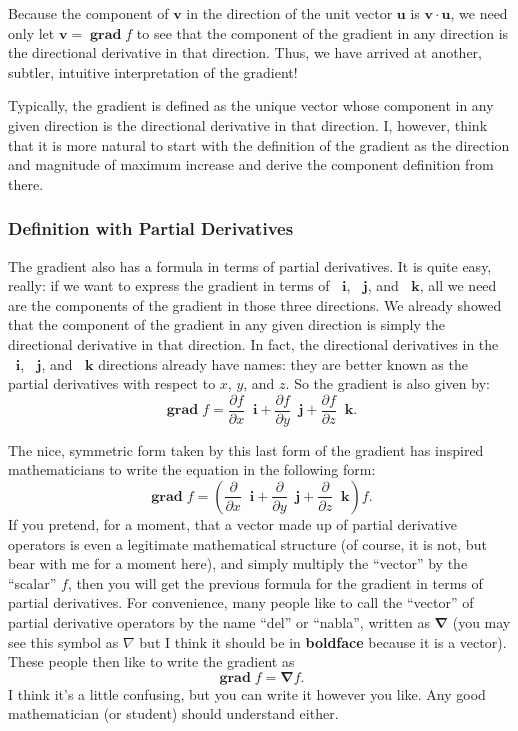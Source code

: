 \documentclass{myarticle}
\DeclareMathOperator{\grad}{\mathbf{grad}}
\renewcommand{\vec}[1]{\mathbf{#1}}
\newcommand{\unitvector}[1]{
  \mathop{}\!\vec{#1}
}
\newcommand{\ih}{\unitvector{i}}
\newcommand{\jh}{\unitvector{j}}
\newcommand{\kh}{\unitvector{k}}
\newcommand{\del}{\boldsymbol{\nabla}}
\theoremstyle{nospace}
\newtheorem{old series theorem}{Theorem}
\newenvironment{series theorem}
{\begin{mdframed}\begin{old series theorem}}
    {\end{old series theorem}\end{mdframed}}
\begin{document}
Because the component of $\vec{v}$ in the direction of the unit vector
$\vec{u}$ is $\vec{v} \cdot \vec{u}$, we need only let
$\vec{v} = \grad f$ to see that the component of the gradient in any
direction is the directional derivative in that direction. Thus, we
have arrived at another, subtler, intuitive interpretation of the
gradient!

Typically, the gradient is defined as the unique vector whose
component in any given direction is the directional derivative in that
direction. I, however, think that it is more natural to start with the
definition of the gradient as the direction and magnitude of maximum
increase and derive the component definition from there.

\subsubsection{Definition with Partial Derivatives}
\label{sec:gradient definition with partial derivatives}

The gradient also has a formula in terms of partial derivatives. It is
quite easy, really: if we want to express the gradient in terms of
$\ih$, $\jh$, and $\kh$, all we need are the components of the
gradient in those three directions. We already showed that the
component of the gradient in any given direction is simply the
directional derivative in that direction. In fact, the directional
derivatives in the $\ih$, $\jh$, and $\kh$ directions already have
names: they are better known as the partial derivatives with respect
to $x$, $y$, and $z$. So the gradient is also given by:
\[
  \grad f =
  \frac{\partial f}{\partial x} \ih +
  \frac{\partial f}{\partial y} \jh +
  \frac{\partial f}{\partial z} \kh.
\]

The nice, symmetric form taken by this last form of the gradient has
inspired mathematicians to write the equation in the following form:
\[
  \grad f = \left(
    \frac{\partial}{\partial x} \ih +
    \frac{\partial}{\partial y} \jh +
    \frac{\partial}{\partial z} \kh
  \right)f.
\]
If you pretend, for a moment, that a vector made up of partial
derivative operators is even a legitimate mathematical structure (of
course, it is not, but bear with me for a moment here), and simply
multiply the ``vector'' by the ``scalar'' $f$, then you will get the
previous formula for the gradient in terms of partial derivatives. For
convenience, many people like to call the ``vector'' of partial
derivative operators by the name ``del'' or ``nabla'', written as
$\del$ (you may see this symbol as $\nabla$ but I think it should be
in \textbf{boldface} because it is a vector). These people then like
to write the gradient as
\[
  \grad f = \del f.
\]
I think it's a little confusing, but you can write it however you
like. Any good mathematician (or student) should understand either.
\end{document}
